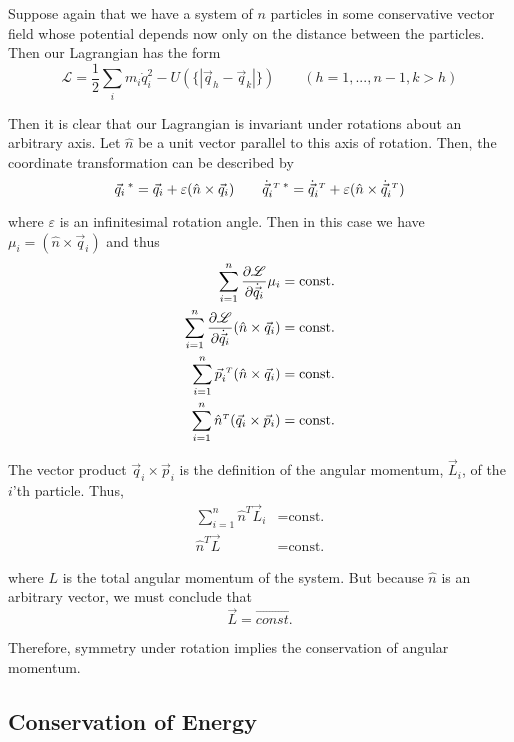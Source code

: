\documentclass[12pt]{article}
\newcommand{\Lagr}	{\mathscr{L}}		%
\newcommand{\q}		{\vec{q}}
\newcommand{\p}		{\vec{p}}
\newcommand{\T}		{{\hspace{0.1cm} \scriptscriptstyle{T}}}
\begin{document}
Suppose again that we have a system of $n$ particles in some conservative vector field whose potential depends now only on the distance between the particles. Then our Lagrangian has the form
\begin{equation*}
\Lagr = \frac{1}{2} \sum_i m_i \dot{q}_i^2 
		- U(\{ | \vec{q}_h - \vec{q}_k | \}) 
		\qquad (h = 1, ... , n-1, k > h)
\end{equation*}

Then it is clear that our Lagrangian is invariant under rotations about an arbitrary axis. Let $\hat{n}$ be a unit vector parallel to this axis of rotation. Then, the coordinate transformation can be described by
\begin{equation*}
\q_i\,^* = \q_i + \varepsilon 
	( \hat{n} \times \q_i ) \qquad
\dot{\q}^\T_i\,^* = \dot{\q}^\T_i + \varepsilon 
	( \hat{n} \times \dot{\q}^\T_i )
\end{equation*}

where $\varepsilon$ is an infinitesimal rotation angle. Then in this case we have $\mu_i = ( \hat{n} \times \q_i )$ and thus
\begin{align*}
\sum_{i=1}^n \frac{\partial \Lagr}{\partial \dot{\q}_i} \mu_i 
	&= \text{const.} \\
\sum_{i=1}^n \frac{\partial \Lagr}{\partial \dot{\q}_i} 
	( \hat{n} \times \q_i ) &= \text{const.} \\
\sum_{i=1}^n \p_i^\T ( \hat{n} \times \q_i ) 
	&= \text{const.} \\ 
\sum_{i=1}^n \hat{n}^{\scriptscriptstyle{T}} (\q_i \times \p_i)
	&= \text{const.} 
\end{align*}

The vector product $\q_i \times \p_i$ is the definition of the angular momentum, $\vec{L}_i$, of the $i$'th particle. Thus,
\begin{align*}
\sum_{i=1}^n \hat{n}^{\scriptscriptstyle{T}} \vec{L}_i
	&= \text{const.} 			\\
\hat{n}^{\scriptscriptstyle{T}} \vec{L}
	&= \text{const.} 
\end{align*}

where $L$ is the total angular momentum of the system. But because $\hat{n}$ is an arbitrary vector, we must conclude that
\begin{equation*}
\vec{L} = \vec{const.}
\end{equation*}

Therefore, symmetry under rotation implies the conservation of angular momentum.

\pagebreak
\subsection{Conservation of Energy}
\end{document}
